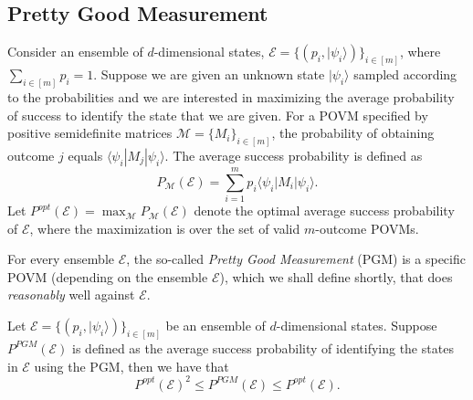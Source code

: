\documentclass[twoside,11pt]{article}
\newcommand{\ket}[1]{|#1\rangle}
\newcommand{\braketbra}[3]{\langle #1|#2| #3 \rangle}
\newcommand{\E}{\mathcal{E}}
\newcommand{\M}{\mathcal{M}}
\begin{document}
\subsection{Pretty Good Measurement}
\label{section:pgm}
Consider an ensemble of $d$-dimensional states, $\E=\{(p_i,\ket{\psi_i})\}_{i\in[m]}$, where $\sum_{i\in [m]} p_i=1$. Suppose we are given an unknown state $\ket{\psi_{i}}$ sampled according to the probabilities and we are interested in maximizing the average probability of success to identify the state that we are given. For a POVM specified by positive semidefinite  matrices $\M=\{M_i\}_{i\in[m]}$, the probability of obtaining outcome $j$ equals $\braketbra{\psi_i}{M_j}{\psi_i}$. The average success probability is defined as
$$
P_{\M}(\E) = \sum_{i=1}^m p_i\braketbra{\psi_i}{M_i}{\psi_i}.
$$
Let $P^{opt}(\E)=\max_{\M} P_{\M}(\E)$ denote the optimal average success probability of $\E$, where the maximization is over the set of valid $m$-outcome POVMs.

For every ensemble $\E$, the so-called \emph{Pretty Good Measurement} (PGM) is a specific POVM (depending on the ensemble $\E$), which we shall define shortly, that does \emph{reasonably} well against $\E$. 

\begin{theorem}
Let $\E=\{(p_i,\ket{\psi_i})\}_{i\in[m]}$ be an ensemble of $d$-dimensional states. Suppose $P^{PGM}(\E)$ is defined as the average success probability of identifying the states in $\E$ using the PGM, then we have that 
$$
P^{opt}(\E)^2 \leq P^{PGM}(\E)\leq  P^{opt}(\E).
$$
\end{theorem}
\end{document}
